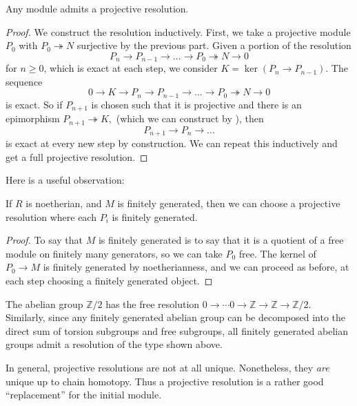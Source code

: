 \begin{proposition} Any module admits a projective resolution. \end{proposition}
\begin{proof} 
We construct the resolution inductively. 
First, we take a projective module $P_0$ with $P_0 \twoheadrightarrow N$
surjective by the previous part.  Given a portion of the resolution
\[ P_n \to P_{n-1} \to \dots \to P_0 \twoheadrightarrow N \to 0  \]
for $n \geq 0$, which is exact at each step, we consider $K = \ker(P_n \to
P_{n-1})$. The sequence 
\[ 0 \to K \to P_n \to P_{n-1} \to \dots \to P_0 \twoheadrightarrow N \to 0  \]
is exact. So if $P_{n+1}$ is chosen such that it is projective and there is an
epimorphism
\( P_{n+1} \twoheadrightarrow K,  \)
(which we can construct by ), then
\[ P_{n+1} \to P_n \to \dots  \]
is exact at every new step by construction. We can repeat this inductively and
get a full projective resolution.
\end{proof}

Here is a useful observation:
\begin{proposition}
If $R$ is noetherian, and $M$ is finitely generated, then we can
choose a
projective resolution where each $P_i$ is finitely generated.
\end{proposition}
\begin{proof}
To say that $M$ is finitely generated is to say that it is a
quotient of a free module on
finitely many generators, so we can take $P_0$ free. The kernel
of $P_0 \to M$
is finitely generated by noetherianness, and we can proceed as
before, at each step
choosing a finitely generated object.
\end{proof}
\begin{example} The abelian group $\mathbb{Z}/2$ has the free
resolution $0\rightarrow\cdots
0\rightarrow\mathbb{Z}\rightarrow\mathbb{Z}\rightarrow\mathbb{Z}/2$.
Similarly, since any finitely generated abelian group can be
decomposed into the direct sum of torsion subgroups and free
subgroups, all finitely generated abelian groups admit a
resolution of the type shown above.\end{example}

In general, projective resolutions are not at all unique. 
Nonetheless, they \emph{are} unique up to chain homotopy. Thus a projective
resolution is a rather good ``replacement'' for the initial module.

